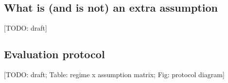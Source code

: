 \documentclass[10pt,twocolumn,letterpaper]{article}
\newcommand{\todo}[1]{{\color{red}[TODO: #1]}}
\begin{document}
\subsection{What is (and is not) an extra assumption}
\label{sec:assumptions}
\todo{draft}

\subsection{Evaluation protocol}
\label{sec:protocol}
\todo{draft; Table: regime x assumption matrix; Fig: protocol diagram}
\end{document}
